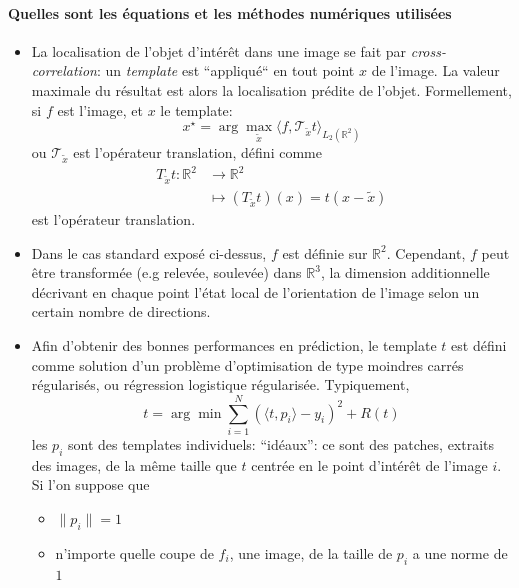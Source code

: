 \documentclass{article}
\begin{document}
\paragraph{Quelles sont les équations et les méthodes numériques utilisées} 
\begin{itemize}
    \item La localisation de l'objet d'intérêt dans une image se fait par \emph{cross-correlation}: un
        \emph{template} est ``appliqué`` en tout point $ x $ de l'image.  La valeur
        maximale du résultat est alors la localisation prédite de l'objet. Formellement,
        si $ f $ est l'image, et $ x $ le template:
      \[
      {x}^{\star} = \arg \max_{ \tilde{ x } } \langle  f, \mathcal  T_{ \tilde{ x }}
      t\rangle_{L_2(\mathbb{R}^2)}
      \] 
      ou $ \mathcal  T_{ \tilde{ x }}$  est l'opérateur translation, défini comme
      \[
      \begin{aligned}
        T_{ \tilde{ x }}t:  \mathbb{R}^2 &\longrightarrow \mathbb{R}^2 \\
                                         &\longmapsto \left ( T_{ \tilde{ x }}t \right )(x) = t( x - \tilde{ x })
      \end{aligned}
      \] 
       est l'opérateur translation.
    \item Dans le cas standard exposé ci-dessus, $ f $ est définie sur $ \mathbb{R}^2 $. Cependant, $ f $
        peut être transformée (e.g relevée, soulevée) dans $ \mathbb{R}^3 $, la dimension
        additionnelle décrivant en chaque point l'état local de l'orientation de l'image
        selon un certain nombre de directions.
    \item Afin d'obtenir des bonnes performances en prédiction, le template $ t $ est
      défini comme solution d'un problème d'optimisation de type
        moindres carrés régularisés, ou régression logistique régularisée.
        Typiquement,
        \[
        t = \arg \min_{  } \sum\limits_{ i=1 }^{ N } \left ( \langle t, p_i \rangle
        - y_i \right )^2 + R(t) 
        \] 
        les $ p_i $ sont des templates individuels: ``idéaux'': ce sont des patches,
        extraits des images, de la même taille que $ t $ centrée en le point d'intérêt
        de l'image $ i $. Si l'on suppose que 
        \begin{itemize}
            \item $ \|p_i\| = 1 $
            \item n'importe quelle coupe de $ f_i $, une image, de la taille de $ p_i $ a une norme
                de $ 1 $

\end{itemize}
\end{itemize}
\end{document}
